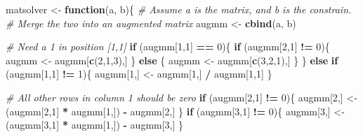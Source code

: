 \documentclass[]{article}
\newenvironment{Shaded}{\begin{snugshade}}{\end{snugshade}}
\newcommand{\KeywordTok}[1]{\textcolor[rgb]{0.13,0.29,0.53}{\textbf{#1}}}
\newcommand{\DecValTok}[1]{\textcolor[rgb]{0.00,0.00,0.81}{#1}}
\newcommand{\StringTok}[1]{\textcolor[rgb]{0.31,0.60,0.02}{#1}}
\newcommand{\CommentTok}[1]{\textcolor[rgb]{0.56,0.35,0.01}{\textit{#1}}}
\newcommand{\ControlFlowTok}[1]{\textcolor[rgb]{0.13,0.29,0.53}{\textbf{#1}}}
\newcommand{\OperatorTok}[1]{\textcolor[rgb]{0.81,0.36,0.00}{\textbf{#1}}}
\newcommand{\NormalTok}[1]{#1}
\begin{document}
\begin{Shaded}
\begin{Highlighting}[]
\NormalTok{matsolver <-}\StringTok{ }\ControlFlowTok{function}\NormalTok{(a, b)\{}
  \CommentTok{# Assume a is the matrix, and b is the constrain. }
  \CommentTok{# Merge the two into an augmented matrix}
\NormalTok{  augmm <-}\StringTok{ }\KeywordTok{cbind}\NormalTok{(a, b)}
  
  \CommentTok{# Need a 1 in position [1,1]}
  \ControlFlowTok{if}\NormalTok{ (augmm[}\DecValTok{1}\NormalTok{,}\DecValTok{1}\NormalTok{] }\OperatorTok{==}\StringTok{ }\DecValTok{0}\NormalTok{)\{}
    \ControlFlowTok{if}\NormalTok{ (augmm[}\DecValTok{2}\NormalTok{,}\DecValTok{1}\NormalTok{] }\OperatorTok{!=}\StringTok{ }\DecValTok{0}\NormalTok{)\{}
\NormalTok{      augmm <-}\StringTok{ }\NormalTok{augmm[}\KeywordTok{c}\NormalTok{(}\DecValTok{2}\NormalTok{,}\DecValTok{1}\NormalTok{,}\DecValTok{3}\NormalTok{),]}
\NormalTok{    \}}
    \ControlFlowTok{else}\NormalTok{ \{}
\NormalTok{      augmm <-}\StringTok{ }\NormalTok{augmm[}\KeywordTok{c}\NormalTok{(}\DecValTok{3}\NormalTok{,}\DecValTok{2}\NormalTok{,}\DecValTok{1}\NormalTok{),]}
\NormalTok{    \}}
\NormalTok{  \}}
  \ControlFlowTok{else} \ControlFlowTok{if}\NormalTok{ (augmm[}\DecValTok{1}\NormalTok{,}\DecValTok{1}\NormalTok{] }\OperatorTok{!=}\StringTok{ }\DecValTok{1}\NormalTok{)\{}
\NormalTok{    augmm[}\DecValTok{1}\NormalTok{,] <-}\StringTok{ }\NormalTok{augmm[}\DecValTok{1}\NormalTok{,] }\OperatorTok{/}\StringTok{ }\NormalTok{augmm[}\DecValTok{1}\NormalTok{,}\DecValTok{1}\NormalTok{] }
\NormalTok{  \}}
  
  \CommentTok{# All other rows in column 1 should be zero}
  \ControlFlowTok{if}\NormalTok{ (augmm[}\DecValTok{2}\NormalTok{,}\DecValTok{1}\NormalTok{] }\OperatorTok{!=}\StringTok{ }\DecValTok{0}\NormalTok{)\{}
\NormalTok{    augmm[}\DecValTok{2}\NormalTok{,] <-}\StringTok{ }\NormalTok{(augmm[}\DecValTok{2}\NormalTok{,}\DecValTok{1}\NormalTok{] }\OperatorTok{*}\StringTok{ }\NormalTok{augmm[}\DecValTok{1}\NormalTok{,]) }\OperatorTok{-}\StringTok{ }\NormalTok{augmm[}\DecValTok{2}\NormalTok{,]}
\NormalTok{  \}}
  \ControlFlowTok{if}\NormalTok{ (augmm[}\DecValTok{3}\NormalTok{,}\DecValTok{1}\NormalTok{] }\OperatorTok{!=}\StringTok{ }\DecValTok{0}\NormalTok{)\{}
\NormalTok{    augmm[}\DecValTok{3}\NormalTok{,] <-}\StringTok{ }\NormalTok{(augmm[}\DecValTok{3}\NormalTok{,}\DecValTok{1}\NormalTok{] }\OperatorTok{*}\StringTok{ }\NormalTok{augmm[}\DecValTok{1}\NormalTok{,]) }\OperatorTok{-}\StringTok{ }\NormalTok{augmm[}\DecValTok{3}\NormalTok{,]}
\NormalTok{  \}}
  

\end{Highlighting}
\end{Shaded}
\end{document}

